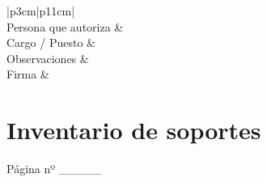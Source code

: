 \documentclass[a4paper,11pt,bibtotoc,noliststotoc]{scrbook}
\begin{document}
\begin{center}
\begin{supertabular}{|p{3cm}|p{11cm}|}
	\hline
	\\
	\hline
	Persona que autoriza &  \\
	\hline
	Cargo / Puesto & \\
	\hline
	Observaciones & \\
	\hline
	Firma & \\
	\hline
\end{supertabular}
\end{center}







\chapter{Inventario de soportes}

\hfill Página nº \_\_\_\_\_
\end{document}
